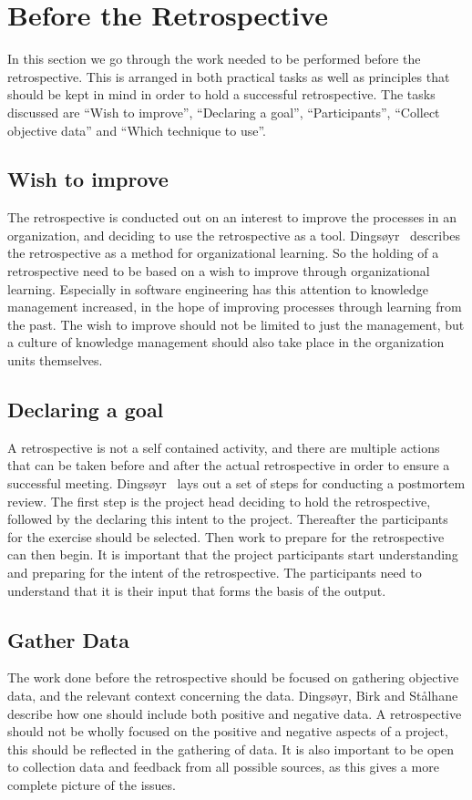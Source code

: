 \documentclass[12pt]{article}
\begin{document}
\section{Before the Retrospective}
In this section we go through the work needed to be performed before the retrospective. This is arranged in both practical tasks as well as principles that should be kept in mind in order to hold a successful retrospective. The tasks discussed are ``Wish to improve'', ``Declaring a goal'', ``Participants'', ``Collect objective data'' and ``Which technique to use''. 

\subsection{Wish to improve}
The retrospective is conducted out on an interest to improve the processes in an organization, and deciding to use the retrospective as a tool. Dingsøyr~\cite{Dingsoyr2005} describes the retrospective as a method for organizational learning. So the holding of a retrospective need to be based on a wish to improve through organizational learning. Especially in software engineering has this attention to knowledge management increased, in the hope of improving processes through learning from the past. The wish to improve should not be limited to just the management, but a culture of knowledge management should also take place in the organization units themselves.

\subsection{Declaring a goal}
A retrospective is not a self contained activity, and there are multiple actions that can be taken before and after the actual retrospective in order to ensure a successful meeting. Dingsøyr~\cite{Dingsoyr2005} lays out a set of steps for conducting a postmortem review. The first step is the project head deciding to hold the retrospective, followed by the declaring this intent to the project. Thereafter the participants for the exercise should be selected. Then work to prepare for the retrospective can then begin. It is important that the project participants start understanding and preparing for the intent of the retrospective. The participants need to understand that it is their input that forms the basis of the output.

\subsection{Gather Data}
The work done before the retrospective should be focused on gathering objective data, and the relevant context concerning the data. Dingsøyr, Birk and Stålhane~\cite{Moe2001}  describe how one should include both positive and negative data. A retrospective should not be wholly focused on the positive and negative aspects of a project, this should be reflected in the gathering of data. It is also important to be open to collection data and feedback from all possible sources, as this gives a more complete picture of the issues.
\end{document}
